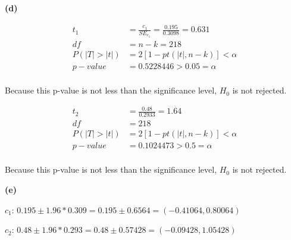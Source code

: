 \documentclass[11pt]{article}
\renewcommand\part[1]{\vspace{.10in}\textbf{(#1)}\par}
\begin{document}
	\part{d}
		\begin{align*}
			t_{1} &= \frac{c_{1}}{SE_{c_{1}}} = \frac{0.195}{0.3098} = 0.631\\
			df &= n-k =218\\
			P(|T| > |t|) &= 2[1-pt(|t|, n-k)] < \alpha \\
			p-value &= 0.5228446 > 0.05 = \alpha\\
		\end{align*}\par
		Because this p-value is not less than the significance level, $H_{0}$ is not rejected.\par
		\begin{align*}
			t_{2} &= \frac{0.48}{0.2933} = 1.64\\
			df &= 218\\
			P(|T| > |t|) &= 2[1-pt(|t|, n-k)] < \alpha \\
			p-value &= 0.1024473 > 0.5 = \alpha\\
		\end{align*}\par
		Because this p-value is not less than the significance level, $H_{0}$ is not rejected.\par
	
	\part{e}
		$c_{1}$:
		$0.195 \pm 1.96 * 0.309 = 0.195 \pm 0.6564 = (-0.41064, 0.80064)$\par
		$c_{2}$:
		$0.48 \pm 1.96 * 0.293 = 0.48 \pm 0.57428 = (-0.09428, 1.05428)$\par
\end{document}
